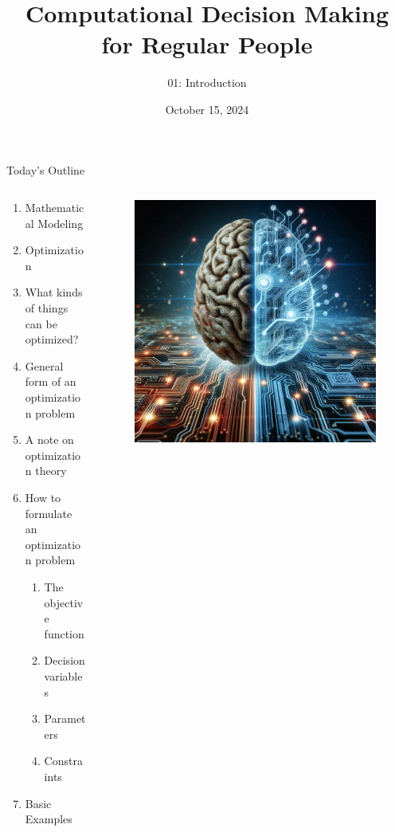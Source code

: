 \documentclass[10pt, aspectratio=169]{beamer}
\title{Computational Decision Making for Regular People}
\subtitle{01: Introduction}
\date{October 15, 2024}
\begin{document}
\begin{frame}
    \maketitle
\end{frame}

\begin{frame}{Today's Outline}
    \begin{columns}
        \begin{column}{0.5\textwidth}
            \begin{enumerate}
                \item Mathematical Modeling
                \item Optimization
                \item What kinds of things can be optimized?
                \item General form of an optimization problem
                \item A note on optimization theory
                \item How to formulate an optimization problem
                \begin{enumerate}
                    \item The objective function
                    \item Decision variables
                    \item Parameters
                    \item Constraints
                \end{enumerate}
                \item Basic Examples
            \end{enumerate}
        \end{column}
        \begin{column}{0.5\textwidth}
            \begin{figure}
                \includegraphics[width=0.95\linewidth]{Brain.jpeg}

\end{figure}
\end{column}
\end{columns}
\end{frame}
\end{document}
